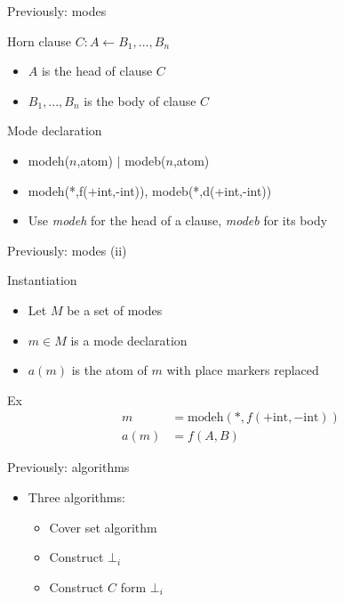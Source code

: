 \begin{frame}{Previously: modes}

\begin{block}{Horn clause}
$C: A \leftarrow B_1, ..., B_n$
\begin{itemize}
    \item $A$ is the head of clause $C$
    \item $B_1, ..., B_n$ is the body of clause $C$
\end{itemize}
\end{block}
\begin{block}{Mode declaration}
\begin{itemize}
    \item modeh($n$,atom) $|$ modeb($n$,atom)
    \item modeh(*,f(+int,-int)), modeb(*,d(+int,-int))
    \item Use \textit{modeh} for the head of a clause, \textit{modeb} for its body
\end{itemize}
\end{block}    

\end{frame}

\begin{frame}{Previously: modes (ii)}
\begin{block}{Instantiation}
\begin{itemize}
    \item Let $M$ be a set of modes
    \item $m \in M$ is a mode declaration
    \item $a(m)$ is the atom of $m$ with place markers replaced
\end{itemize}
Ex
\begin{align*}
m &= \text{modeh}(*,f(+\text{int},-\text{int})) \\
a(m) &= f(A,B)
\end{align*}
\end{block}
\end{frame}

\begin{frame}{Previously: algorithms}
\begin{itemize}
    \item Three algorithms:
    \begin{itemize}
    \item Cover set algorithm
    \item Construct $\bot_i$
    \item Construct $C$ form $\bot_i$
    \end{itemize}
\end{itemize}    
\end{frame}


